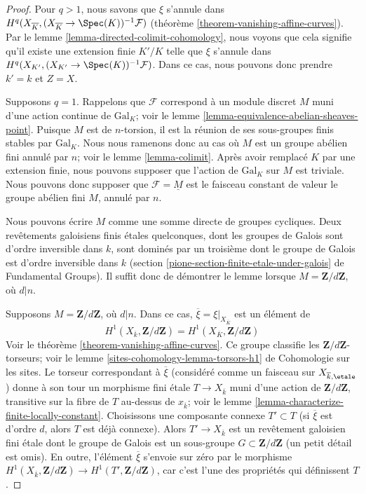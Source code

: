 \begin{proof}
Pour $q > 1$, nous savons que $\xi$ s'annule dans
$H^q(X_{\overline{K}}, (X_{\overline{K}} \to \Spec(K))^{-1}\mathcal{F})$
(théorème \ref{theorem-vanishing-affine-curves}).
Par le lemme \ref{lemma-directed-colimit-cohomology}, nous voyons que
cela signifie qu'il existe une extension finie $K'/K$ telle que
$\xi$ s'annule dans $H^q(X_{K'}, (X_{K'} \to \Spec(K))^{-1}\mathcal{F})$.
Dans ce cas, nous pouvons donc prendre $k' = k$ et $Z = X$.

\medskip\noindent
Supposons $q = 1$. Rappelons que $\mathcal{F}$ correspond à un
module discret $M$ muni d'une action continue de $\text{Gal}_K$; voir le
lemme \ref{lemma-equivalence-abelian-sheaves-point}.
Puisque $M$ est de $n$-torsion, il est la réunion de ses sous-groupes finis
stables par $\text{Gal}_K$. Nous nous ramenons donc
au cas où $M$ est un groupe abélien fini annulé par $n$;
voir le lemme \ref{lemma-colimit}. Après avoir remplacé $K$ par une extension finie,
nous pouvons supposer que l'action de $\text{Gal}_K$ sur $M$ est triviale.
Nous pouvons donc supposer que $\mathcal{F} = \underline{M}$ est le faisceau
constant de valeur le groupe abélien fini $M$, annulé par $n$.

\medskip\noindent
Nous pouvons écrire $M$ comme une somme directe de groupes cycliques.
Deux revêtements galoisiens finis étales quelconques, dont les groupes de Galois
sont d'ordre inversible dans $k$, sont dominés par un troisième dont le
groupe de Galois est d'ordre inversible dans $k$
(section \ref{pione-section-finite-etale-under-galois} de Fundamental Groups).
Il suffit donc de démontrer le lemme lorsque
$M = \mathbf{Z}/d\mathbf{Z}$, où $d | n$.

\medskip\noindent
Supposons $M = \mathbf{Z}/d\mathbf{Z}$, où $d | n$.
Dans ce cas, $\overline{\xi} = \xi|_{X_{\overline{K}}}$ est un élément de
$$
H^1(X_{\overline{k}}, \mathbf{Z}/d\mathbf{Z}) =
H^1(X_{\overline{K}}, \mathbf{Z}/d\mathbf{Z})
$$
Voir le théorème \ref{theorem-vanishing-affine-curves}.
Ce groupe classifie les $\mathbf{Z}/d\mathbf{Z}$-torseurs; voir le
lemme \ref{sites-cohomology-lemma-torsors-h1} de Cohomologie sur les sites.
Le torseur correspondant à $\overline{\xi}$ (considéré comme un faisceau sur
$X_{\overline{k}, \etale}$) donne à son tour un morphisme fini étale
$T \to X_{\overline{k}}$ muni d'une action de $\mathbf{Z}/d\mathbf{Z}$,
transitive sur la fibre de $T$ au-dessus de $x_{\overline{k}}$; voir le
lemme \ref{lemma-characterize-finite-locally-constant}.
Choisissons une composante connexe $T' \subset T$ (si $\overline{\xi}$ est
d'ordre $d$, alors $T$ est déjà connexe).
Alors $T' \to X_{\overline{k}}$ est un revêtement galoisien
fini étale dont le groupe de Galois est un sous-groupe $G \subset \mathbf{Z}/d\mathbf{Z}$
(un petit détail est omis). En outre, l'élément $\overline{\xi}$ s'envoie sur zéro
par le morphisme $H^1(X_{\overline{k}}, \mathbf{Z}/d\mathbf{Z}) \to
H^1(T', \mathbf{Z}/d\mathbf{Z})$, car c'est l'une
des propriétés qui définissent $T$.


\end{proof}
